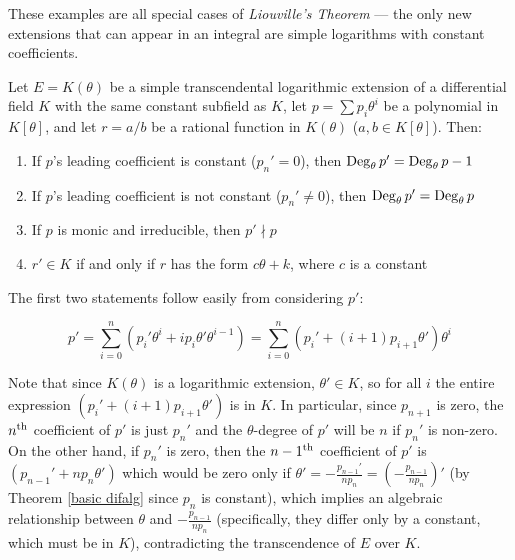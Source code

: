 
These examples are all special cases of {\it Liouville's Theorem} ---
the only new extensions that can appear in an integral are simple
logarithms with constant coefficients.

\theorem\label{basic logarithmic properties}
Let $E=K(\theta)$ be a simple transcendental logarithmic extension of
a differential field $K$ with the same constant subfield as $K$, let
$p=\sum p_i \theta^i$ be a polynomial in $K[\theta]$, and let $r =
a/b$ be a rational function in $K(\theta)$ ($a, b \in K[\theta]$).
Then:

\begin{enumerate}
\item If $p$'s leading coefficient is constant ($p_n' = 0$), then ${\rm Deg}_\theta\, p' = {\rm Deg}_\theta\, p - 1$
\item If $p$'s leading coefficient is not constant ($p_n' \ne 0$), then ${\rm Deg}_\theta\, p' = {\rm Deg}_\theta\, p$
\item If $p$ is monic and irreducible, then $p' \nmid p$
\item $r' \in K$ if and only if $r$ has the form $c\theta + k$, where $c$ is a constant
\end{enumerate}

\proof

The first two statements follow easily from considering $p'$:

$$p'=\sum_{i=0}^n (p_i' \theta^i + i p_i \theta' \theta^{i-1}) = \sum_{i=0}^n
\left(p_i' + \left(i+1\right)p_{i+1} \theta'\right) \theta^i$$

Note that since $K(\theta)$ is a logarithmic extension, $\theta'
\in K$, so for all $i$ the entire expression $(p_i' + (i+1)p_{i+1} \theta')$
is in $K$.  In particular, since $p_{n+1}$ is zero, the $n^{\rm th}$
coefficient of $p'$ is just $p_n'$ and the $\theta$-degree of $p'$
will be $n$ if $p_n'$ is non-zero.  On the other hand, if $p_n'$ is
zero, then the $n-1^{\rm th}$ coefficient of $p'$ is $(p_{n-1}' + n
p_n \theta')$ which would be zero only if $\theta' =
-\frac{p_{n-1}'}{n p_n} = (-\frac{p_{n-1}}{n p_n})'$ (by Theorem
\ref{basic difalg} since $p_n$ is constant), which implies
an algebraic relationship between $\theta$ and $-\frac{p_{n-1}}{n
p_n}$ (specifically, they differ only by a constant, which must be in
$K$), contradicting the transcendence of $E$ over $K$.

